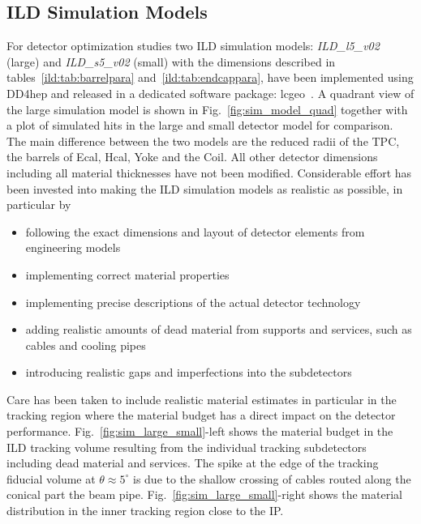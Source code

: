 \subsection{\label{sec:det-models} ILD Simulation Models}

For detector optimization studies two ILD simulation models: \emph{ ILD\_l5\_v02} (large)
and \emph{ ILD\_s5\_v02} (small) with the dimensions described in tables~\ref{ild:tab:barrelpara} and~\ref{ild:tab:endcappara},
have been implemented using DD4hep and released in a dedicated software package: lcgeo~\cite{bib:lcgeo}.
A quadrant view of the large simulation model is shown in Fig.~\ref{fig:sim_model_quad} together with a plot of simulated
hits in the large and small detector model for comparison. The main difference between the two models are the reduced radii of
the TPC, the barrels of Ecal, Hcal, Yoke and the Coil. All other detector dimensions including all material thicknesses have not been modified.
%
Considerable effort has been invested into making the ILD simulation models as realistic as possible, in particular by
\begin{itemize}
\item following the exact dimensions and layout of detector elements from engineering models
\item implementing correct material properties
\item implementing precise descriptions of the actual detector technology
\item adding realistic amounts of dead material from supports and services, such as cables and cooling pipes
\item introducing realistic gaps and imperfections into the subdetectors
\end{itemize}
Care has been taken to include realistic material estimates in particular in the tracking region where
the material budget has a direct impact on the detector performance. 
Fig.~\ref{fig:sim_large_small}-left shows the  material budget in the ILD tracking volume resulting from the
individual tracking subdetectors including dead material and services. The spike at the edge of the tracking
fiducial volume at $\theta \approx 5^{\circ}$ is due to the shallow crossing of cables routed along the
conical part the beam pipe. Fig.~\ref{fig:sim_large_small}-right shows the material distribution in the
inner tracking region close to the IP.


